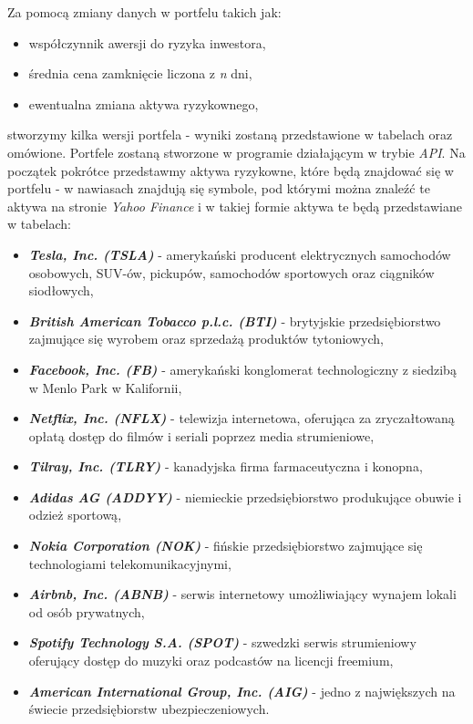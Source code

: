 \documentclass[magister]{dyplom}
\begin{document}
Za pomocą zmiany danych w portfelu takich jak:

\begin{itemize}
	\item współczynnik awersji do ryzyka inwestora,
	\item średnia cena zamknięcie liczona z \textit{n} dni,
	\item ewentualna zmiana aktywa ryzykownego,
\end{itemize}
stworzymy kilka wersji portfela - wyniki zostaną przedstawione w tabelach oraz omówione. Portfele zostaną stworzone w programie działającym w trybie \textit{API}.
Na początek pokrótce przedstawmy aktywa ryzykowne, które będą znajdować się w portfelu - w nawiasach znajdują się symbole, pod którymi można znaleźć te aktywa na stronie \textit{Yahoo Finance} i w takiej formie aktywa te będą przedstawiane w tabelach:

\begin{itemize}
	\item \textit{\textbf{Tesla, Inc. (TSLA)}} - amerykański producent elektrycznych samochodów osobowych, SUV-ów, pickupów, samochodów sportowych oraz ciągników siodłowych\cite{tesla},
	\item \textit{\textbf{British American Tobacco p.l.c. (BTI)}} - brytyjskie przedsiębiorstwo zajmujące się wyrobem oraz sprzedażą produktów tytoniowych,
	\item \textit{\textbf{Facebook, Inc. (FB)}} - amerykański konglomerat technologiczny z siedzibą w Menlo Park w Kalifornii\cite{facebook},
	\item \textit{\textbf{Netflix, Inc. (NFLX)}} - telewizja internetowa, oferująca za zryczałtowaną opłatą dostęp do filmów i seriali poprzez media strumieniowe\cite{netflix},
	\item \textit{\textbf{Tilray, Inc. (TLRY)}} - kanadyjska firma farmaceutyczna i konopna\cite{tilray},
	\item \textit{\textbf{Adidas AG (ADDYY)}} - niemieckie przedsiębiorstwo produkujące obuwie i odzież sportową\cite{adidas},
	\item \textit{\textbf{Nokia Corporation (NOK)}} - fińskie przedsiębiorstwo zajmujące się technologiami telekomunikacyjnymi\cite{nokia},
	\item \textit{\textbf{Airbnb, Inc. (ABNB)}} - serwis internetowy umożliwiający wynajem lokali od osób prywatnych\cite{airbnb},
	\item \textit{\textbf{Spotify Technology S.A. (SPOT)}} - szwedzki serwis strumieniowy oferujący dostęp do muzyki oraz podcastów na licencji freemium\cite{spotify},
	\item \textit{\textbf{American International Group, Inc. (AIG)}} - jedno z największych na świecie przedsiębiorstw ubezpieczeniowych\cite{aig}.
\end{itemize}
\end{document}
